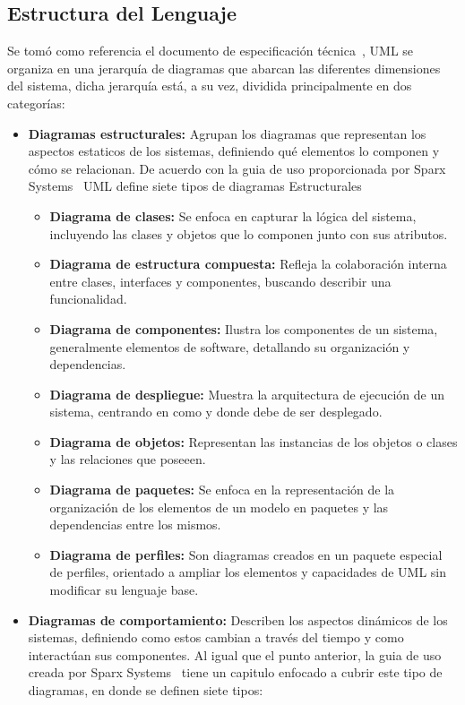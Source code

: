 \subsection{Estructura del Lenguaje}

Se tomó como referencia el documento de especificación técnica~\cite{OMG02}, UML se organiza en una jerarquía de diagramas que abarcan las diferentes dimensiones del sistema, dicha jerarquía está, a su vez, dividida principalmente en dos categorías:

\begin{itemize}
	\item \textbf{Diagramas estructurales:} Agrupan los diagramas que representan los aspectos estaticos de los sistemas, definiendo qué elementos lo componen y cómo se relacionan. De acuerdo con la guia de uso proporcionada por Sparx Systems~\cite{Sparx01} UML define siete tipos de diagramas Estructurales
	\begin{itemize}
		\item \textbf{Diagrama de clases:} Se enfoca en capturar la lógica  del sistema, incluyendo las clases y objetos que lo componen junto con sus atributos.
		\item \textbf{Diagrama de estructura compuesta:} Refleja la colaboración interna entre clases, interfaces y componentes, buscando describir una funcionalidad.
		\item \textbf{Diagrama de componentes:} Ilustra los componentes de un sistema, generalmente elementos de software, detallando su organización y dependencias.
		\item \textbf{Diagrama de despliegue:} Muestra la arquitectura de ejecución de un sistema, centrando en como y donde debe de ser desplegado.
		\item \textbf{Diagrama de objetos:} Representan las instancias de los objetos o clases y las relaciones que poseeen.
		\item \textbf{Diagrama de paquetes:} Se enfoca en la representación de la organización de los elementos de un modelo en paquetes y las dependencias entre los mismos.
		\item \textbf{Diagrama de perfiles:} Son diagramas creados en un paquete especial de perfiles, orientado a ampliar los elementos y capacidades de UML sin modificar su lenguaje base.
	\end{itemize}
	\item \textbf{Diagramas de comportamiento:} Describen los aspectos dinámicos de los sistemas, definiendo como estos cambian a través del tiempo y como interactúan sus componentes. Al igual que el punto anterior, la guia de uso creada por Sparx Systems~\cite{Sparx01} tiene un capitulo enfocado a cubrir  este tipo de diagramas, en donde se definen siete tipos:

\end{itemize}

